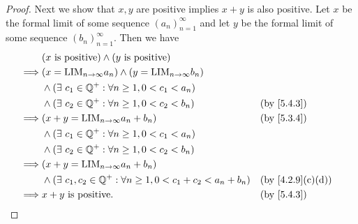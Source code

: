 \begin{proof}
  Next we show that \(x, y\) are positive implies \(x + y\) is also positive.
  Let \(x\) be the formal limit of some sequence \((a_n)_{n = 1}^{\infty}\) and let \(y\) be the formal limit of some sequence \((b_n)_{n = 1}^{\infty}\).
  Then we have
  \begin{align*}
             & (x \text{ is positive}) \land (y \text{ is positive})                                                                \\
    \implies & (x = \text{LIM}_{n \to \infty} a_n) \land (y = \text{LIM}_{n \to \infty} b_n)                                        \\
             & \land (\exists\ c_1 \in \Q^+ : \forall n \geq 1, 0 < c_1 < a_n)                                                      \\
             & \land (\exists\ c_2 \in \Q^+ : \forall n \geq 1, 0 < c_2 < b_n)                  &  & \by{5.4.3}                     \\
    \implies & (x + y = \text{LIM}_{n \to \infty} a_n + b_n)                                    &  & \by{5.3.4}                     \\
             & \land (\exists\ c_1 \in \Q^+ : \forall n \geq 1, 0 < c_1 < a_n)                                                      \\
             & \land (\exists\ c_2 \in \Q^+ : \forall n \geq 1, 0 < c_2 < b_n)                                                      \\
    \implies & (x + y = \text{LIM}_{n \to \infty} a_n + b_n)                                                                        \\
             & \land (\exists\ c_1, c_2 \in \Q^+ : \forall n \geq 1, 0 < c_1 + c_2 < a_n + b_n) &  & \text{(by \cref{4.2.9}(c)(d))} \\
    \implies & x + y \text{ is positive}.                                                       &  & \by{5.4.3}
  \end{align*}


\end{proof}
